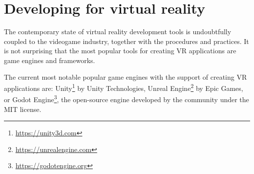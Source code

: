 \hypertarget{x-developing-for-virtual-reality}{\section{Developing for virtual reality}}
The contemporary state of virtual reality development tools is undoubtfully
coupled to the videogame industry, together with the procedures and practices.
It is not surprising that the most popular tools for creating
VR applications are game engines and frameworks.


The current most notable popular game engines with the support of creating VR
applications are: Unity\footnote{\href{https://unity3d.com}{https://unity3d.com}} by
Unity Technologies, Unreal Engine\footnote{\href{https://unrealengine.com}{https://unrealengine.com}} by
Epic Games, or Godot Engine\footnote{\href{https://godotengine.org}{https://godotengine.org}},
the open-source engine developed by the community under the MIT license.\,\cite{slantvr}
